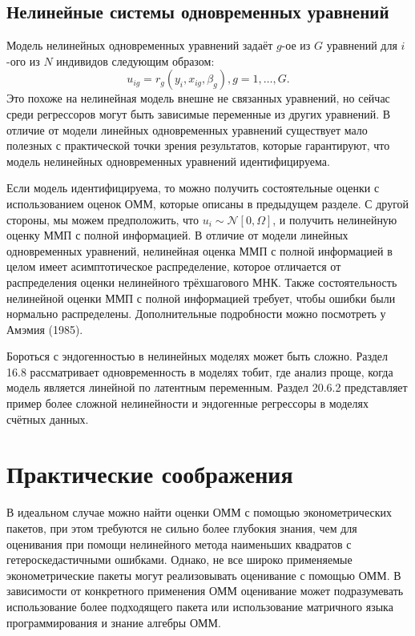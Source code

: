 \subsection{Нелинейные системы одновременных уравнений}

Модель нелинейных одновременных уравнений задаёт $g$-ое из $G$ уравнений для $i$-ого из $N$ индивидов следующим образом:
\begin{equation}
u_{ig} = r_g(y_i,x_{ig},\beta_g), g = 1, \dots, G.
\end{equation}
Это похоже на нелинейная модель внешне не связанных уравнений, но сейчас среди регрессоров могут быть зависимые переменные из других уравнений. В отличие от модели линейных одновременных уравнений существует мало полезных с практической точки зрения результатов, которые гарантируют, что модель нелинейных одновременных уравнений идентифицируема.

Если модель идентифицируема, то можно получить состоятельные оценки с использованием оценок ОММ, которые описаны в предыдущем разделе. С другой стороны, мы можем предположить, что $u_i \sim \mathcal{N}[0, \Omega]$, и получить нелинейную оценку ММП с полной информацией. В отличие от модели линейных одновременных уравнений, нелинейная оценка ММП с полной информацией в целом имеет асимптотическое распределение, которое отличается от распределения оценки нелинейного трёхшагового МНК. Также состоятельность нелинейной оценки ММП с полной информацией требует, чтобы ошибки были нормально распределены. Дополнительные подробности можно посмотреть у Амэмия (1985).

Бороться с эндогенностью в нелинейных моделях может быть сложно. Раздел 16.8 рассматривает одновременность в моделях тобит, где анализ проще, когда модель является линейной по латентным переменным. Раздел 20.6.2 представляет пример более сложной нелинейности и эндогенные регрессоры в моделях счётных данных.

\section{Практические соображения}

В идеальном случае можно найти оценки ОММ с помощью эконометрических пакетов, при этом требуются не сильно более глубокия знания, чем для оценивания при  помощи нелинейного метода наименьших квадратов с гетероскедастичными ошибками. Однако, не все широко применяемые эконометрические пакеты могут реализовывать оценивание с помощью ОММ. В зависимости от конкретного применения ОММ оценивание может подразумевать использование более подходящего пакета или использование матричного языка программирования и знание алгебры ОММ.

